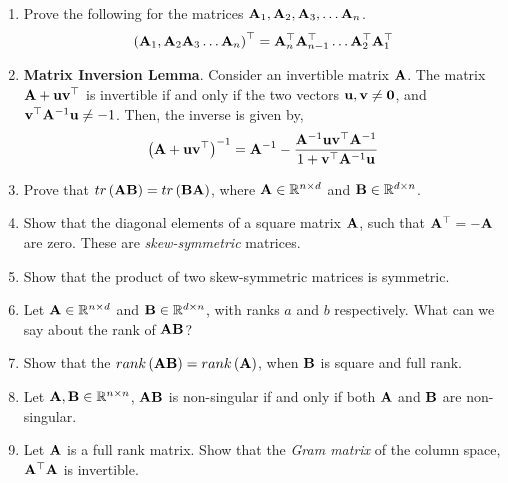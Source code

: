 \documentclass[
10pt, %
a4paper, %
oneside, %
headinclude,footinclude, %
BCOR5mm, %
]{scrartcl}
\def\mf{\ensuremath\mathbf}
\def\mb{\ensuremath\mathbb}
\def\lp{\ensuremath\left(}
\def\rp{\ensuremath\right)}
\begin{document}
\begin{enumerate}
	\item Prove the following for the matrices $\mf{A}_1, \mf{A}_2, \mf{A}_3, \ldots \mf{A}_n$.
	\[ \lp \mf{A}_1, \mf{A}_2 \mf{A}_3 \ldots \mf{A}_n \rp^\top =  \mf{A}_n^\top \mf{A}_{n-1}^\top \ldots \mf{A}_2^\top \mf{A}_1^\top \]


	\item \textbf{Matrix Inversion Lemma}. Consider an invertible matrix $\mf{A}$. The matrix $\mf{A} + \mf{u}\mf{v}^\top$ is invertible if and only if the two vectors $\mf{u}, \mf{v} \neq \mf{0}$, and $\mf{v}^\top\mf{A}^{-1}\mf{u} \neq -1$. Then, the inverse is given by,
	\[ \lp \mf{A} + \mf{u}\mf{v}^\top\rp^{-1} = \mf{A}^{-1} - \frac{\mf{A}^{-1}\mf{u}\mf{v}^\top\mf{A}^{-1}}{1 + \mf{v}^{\top}\mf{A}^{-1}\mf{u}} \]

	\item Prove that $tr\lp \mf{A}\mf{B} \rp = tr\lp \mf{B}\mf{A} \rp$, where $\mf{A} \in \mb{R}^{n \times d}$ and $\mf{B} \in \mb{R}^{d \times n}$.
	
	\item Show that the diagonal elements of a square matrix $\mf{A}$, such that $\mf{A}^\top = -\mf{A}$ are zero. These are \textit{skew-symmetric} matrices.
	
	\item Show that the product of two skew-symmetric matrices is symmetric.

	
	\item Let $\mf{A} \in \mb{R}^{n \times d}$ and $\mf{B} \in \mb{R}^{d \times n}$, with ranks $a$ and $b$ respectively. What can we say about the rank of $\mf{A}\mf{B}$?

	\item Show that the $rank\pp{\mf{A}\mf{B}} = rank\pp{\mf{A}}$, when $\mf{B}$ is square and full rank.

	\item Let $\mf{A}, \mf{B} \in \mb{R}^{n \times n}$, $\mf{A}\mf{B}$ is non-singular if and only if both $\mf{A}$ and $\mf{B}$ are non-singular.

	\item Let $\mf{A}$ is a full rank matrix. Show that the \textit{Gram matrix} of the column space, $\mf{A}^\top\mf{A}$ is invertible.
\end{enumerate}
\end{document}
